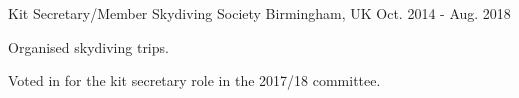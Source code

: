 

\begin{cventries}

  \cventry
    {Kit Secretary/Member} %
    {Skydiving Society} %
    {Birmingham, UK} %
    {Oct. 2014 - Aug. 2018} %
    {
      \begin{cvitems} %
        \item {Organised skydiving trips.}
        \item {Voted in for the kit secretary role in the 2017/18 committee.}
      \end{cvitems}
    }

\end{cventries}
